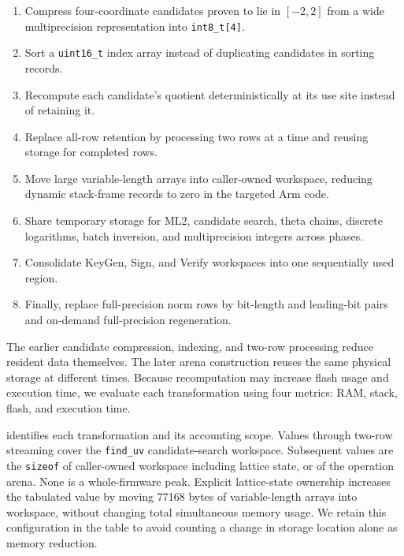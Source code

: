 \documentclass[a4paper,10pt]{article}
\theoremstyle{definition}
\theoremstyle{remark}
\begin{document}
\begin{enumerate}[leftmargin=2.2em]
  \item Compress four-coordinate candidates proven to lie in $[-2,2]$ from a wide multiprecision representation into \texttt{int8\_t[4]}.
  \item Sort a \texttt{uint16\_t} index array instead of duplicating candidates in sorting records.
  \item Recompute each candidate's quotient deterministically at its use site instead of retaining it.
  \item Replace all-row retention by processing two rows at a time and reusing storage for completed rows.
  \item Move large variable-length arrays into caller-owned workspace, reducing dynamic stack-frame records to zero in the targeted Arm code.
  \item Share temporary storage for ML2, candidate search, theta chains, discrete logarithms, batch inversion, and multiprecision integers across phases.
  \item Consolidate KeyGen, Sign, and Verify workspaces into one sequentially used region.
  \item Finally, replace full-precision norm rows by bit-length and leading-bit pairs and on-demand full-precision regeneration.
\end{enumerate}

The earlier candidate compression, indexing, and two-row processing reduce resident data themselves. The later arena construction reuses the same physical storage at different times. Because recomputation may increase flash usage and execution time, we evaluate each transformation using four metrics: RAM, stack, flash, and execution time.

 identifies each transformation and its accounting scope. Values through two-row streaming cover the \texttt{find\_uv} candidate-search workspace. Subsequent values are the \texttt{sizeof} of caller-owned workspace including lattice state, or of the operation arena. None is a whole-firmware peak. Explicit lattice-state ownership increases the tabulated value by moving \num{77168} bytes of variable-length arrays into workspace, without changing total simultaneous memory usage. We retain this configuration in the table to avoid counting a change in storage location alone as memory reduction.
\end{document}
